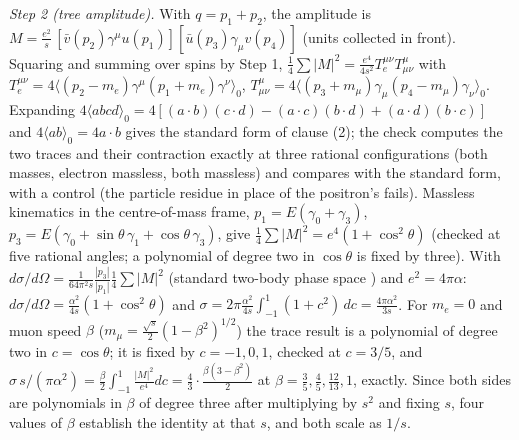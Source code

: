 \emph{Step 2 (tree amplitude).} With $q = p_{1} + p_{2}$, the amplitude is $M = \frac{e^{2}}{s}\,[\bar v(p_{2})\gamma^{\mu}u(p_{1})][\bar u(p_{3})\gamma_{\mu}v(p_{4})]$ (units collected in front). Squaring and summing over spins by Step 1, $\tfrac14\sum|M|^{2} = \tfrac{e^{4}}{4s^{2}}T_{e}^{\mu\nu}T_{\mu\nu}^{\mu}$ with $T_{e}^{\mu\nu} = 4\langle(p_{2} - m_{e})\gamma^{\mu}(p_{1} + m_{e})\gamma^{\nu}\rangle_{0}$, $T^{\mu}_{\mu\nu} = 4\langle(p_{3} + m_{\mu})\gamma_{\mu}(p_{4} - m_{\mu})\gamma_{\nu}\rangle_{0}$. Expanding $4\langle abcd\rangle_{0} = 4[(a\cdot b)(c\cdot d) - (a\cdot c)(b\cdot d) + (a\cdot d)(b\cdot c)]$ and $4\langle ab\rangle_{0} = 4a\cdot b$ gives the standard form of clause (2); the check computes the two traces and their contraction exactly at three rational configurations (both masses, electron massless, both massless) and compares with the standard form, with a control (the particle residue in place of the positron's fails). Massless kinematics in the centre-of-mass frame, $p_{1} = E(\gamma_{0} + \gamma_{3})$, $p_{3} = E(\gamma_{0} + \sin\theta\,\gamma_{1} + \cos\theta\,\gamma_{3})$, give $\tfrac14\sum|M|^{2} = e^{4}(1 + \cos^{2}\theta)$ (checked at five rational angles; a polynomial of degree two in $\cos\theta$ is fixed by three). With $d\sigma/d\Omega = \tfrac{1}{64\pi^{2}s}\tfrac{|p_{3}|}{|p_{1}|}\tfrac14\sum|M|^{2}$ (standard two-body phase space \cite{PeskinSchroeder1995}) and $e^{2} = 4\pi\alpha$: $d\sigma/d\Omega = \tfrac{\alpha^{2}}{4s}(1 + \cos^{2}\theta)$ and $\sigma = 2\pi\tfrac{\alpha^{2}}{4s}\int_{-1}^{1}(1 + c^{2})\,dc = \tfrac{4\pi\alpha^{2}}{3s}$. For $m_{e} = 0$ and muon speed $\beta$ ($m_{\mu} = \tfrac{\sqrt s}{2}(1 - \beta^{2})^{1/2}$) the trace result is a polynomial of degree two in $c = \cos\theta$; it is fixed by $c = -1, 0, 1$, checked at $c = 3/5$, and $\sigma\,s/(\pi\alpha^{2}) = \tfrac{\beta}{2}\int_{-1}^{1}\tfrac{|M|^{2}}{e^{4}}dc = \tfrac43\cdot\tfrac{\beta(3 - \beta^{2})}{2}$ at $\beta = \tfrac35, \tfrac45, \tfrac{12}{13}, 1$, exactly. Since both sides are polynomials in $\beta$ of degree three after multiplying by $s^{2}$ and fixing $s$, four values of $\beta$ establish the identity at that $s$, and both scale as $1/s$.

